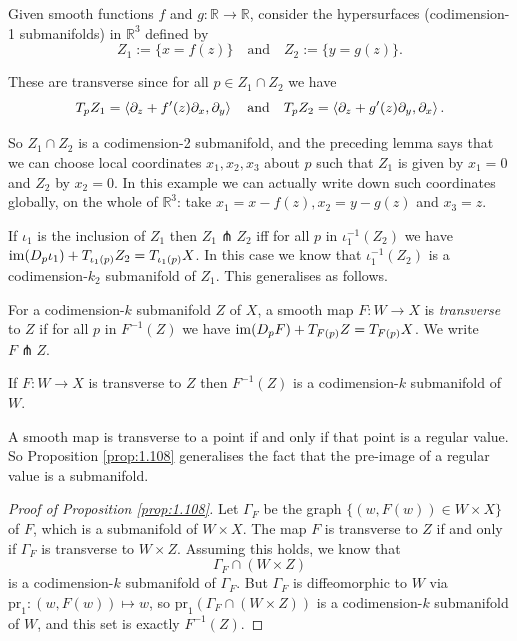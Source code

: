 \documentclass[a4paper,11pt]{article}
\begin{document}
	\begin{ex}
		Given smooth functions $f$ and $g : \mathbb{R} \to \mathbb{R}$, consider the hypersurfaces (codimension-1 submanifolds) in $\mathbb{R}^3$ defined by
		\[
			Z_1 := \{x = f(z)\} \quad \text{and} \quad Z_2 := \{y = g(z)\}. 
		\]
		
		These are transverse since for all $p \in Z_1 \cap Z_2$ we have
		\[
			T_p Z_1 = \expval{\partial_z + f'(z)\partial_x, \partial_y} \quad \text{and} \quad T_p Z_2 = \expval{\partial_z + g'(z)\partial_y, \partial_x}.
		\]
		
		So $Z_1 \cap Z_2$ is a codimension-2 submanifold, and the preceding lemma says that we can choose local coordinates $x_1, x_2, x_3$ about $p$ such that $Z_1$ is given by $x_1 = 0$ and $Z_2$ by $x_2 = 0$. In this example we can actually write down such coordinates globally, on the whole of $\mathbb{R}^3$: take $x_1 = x - f(z), x_2 = y - g(z)$ and $x_3 = z$.
	\end{ex}

	If $\iota_1$ is the inclusion of $Z_1$ then $Z_1 \pitchfork Z_2$ iff for all $p$ in $\iota_1^{-1}(Z_2)$ we have $\operatorname{im}(D_p \iota_1) + T _{\iota_1(p)}Z_2 = T _{\iota_1(p)}X$. In this case we know that $\iota_1^{-1}(Z_2)$ is a codimension-$k_2$ submanifold of $Z_1$. This generalises as follows.
	
	\begin{defi}
		For a codimension-$k$ submanifold $Z$ of $X$, a smooth map $F: W \to X$ is \emph{transverse} to $Z$ if for all $p$ in $F^{-1}(Z)$ we have $\operatorname{im}(D_p F) + T _{F(p)}Z = T _{F(p)} X$. We write $F \pitchfork Z$. 
	\end{defi}

	\begin{prop}
		If $F : W \to X$ is transverse to $Z$ then $F^{-1}(Z)$ is a codimension-$k$ submanifold of $W$.
		\label{prop:1.108}
	\end{prop}

	\begin{rmk}
		A smooth map is transverse to a point if and only if that point is a regular value. So Proposition \ref{prop:1.108} generalises the fact that the pre-image of a regular value is a submanifold.
	\end{rmk}

	\begin{proof}[Proof of Proposition \ref{prop:1.108}]
		Let $\Gamma_F$ be the graph $\{(w,F(w)) \in W \times X\}$ of $F$, which is a submanifold of $W \times X$. The map $F$ is transverse to $Z$ if and only if $\Gamma_F$ is transverse to $W \times Z$. Assuming this holds, we know that
		\[
			\Gamma_F \cap (W \times Z)
		\]
		is a codimension-$k$ submanifold of $\Gamma_F$. But $\Gamma_F$ is diffeomorphic to $W$ via $\text{pr}_1 : (w, F(w))\mapsto w$, so $\text{pr}_1(\Gamma_F \cap (W\times Z))$ is a codimension-$k$ submanifold of $W$, and this set is exactly $F^{-1}(Z)$. 
	\end{proof}
\end{document}
